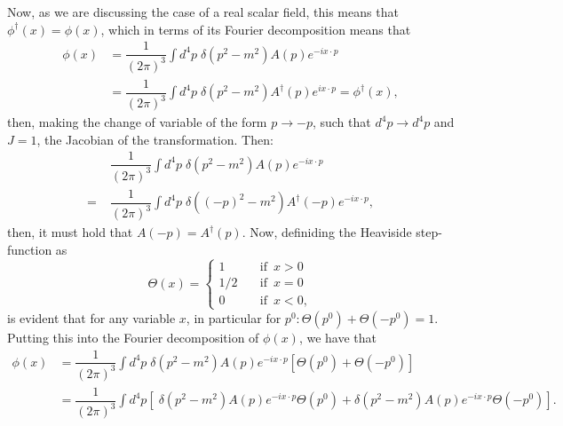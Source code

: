 Now, as we are discussing the case of a real scalar field, this means that $\phi^{\dagger}(x) = \phi(x)$, which in terms of its Fourier decomposition means that
\begin{align*}
    \phi(x) &= \dfrac{1}{(2\pi)^3}\int d^4p \; \delta(p^2 - m^2) A(p)e^{-ix\cdot p} \\
    &= \dfrac{1}{(2\pi)^3}\int d^4p \; \delta(p^2 - m^2) A^{\dagger}(p)e^{ix\cdot p} = \phi^{\dagger}(x),
\end{align*}
then, making the change of variable of the form $p\rightarrow-p$, such that $d^4p\rightarrow d^4p$ and $J=1$, the Jacobian of the transformation. Then:
\begin{align*}
    &\dfrac{1}{(2\pi)^3}\int d^4p \; \delta(p^2 - m^2) A(p)e^{-ix\cdot p} \\
    = \; &\dfrac{1}{(2\pi)^3}\int d^4p \; \delta((-p)^2 - m^2) A^{\dagger}(-p)e^{-ix\cdot p},
\end{align*}
then, it must hold that $A(-p) = A^{\dagger}(p)$. Now, definiding the Heaviside step-function as
\[   
\Theta(x) =
\begin{cases}
    1 \quad &\textrm{if}\;\ x > 0\\
    1/2 \quad &\textrm{if}\;\ x = 0\\
    0 \quad &\textrm{if}\;\ x < 0,
\end{cases} 
\]
is evident that for any variable $x$, in particular for $p^0: \Theta(p^0) + \Theta(-p^0) = 1$. Putting this into the Fourier decomposition of $\phi(x)$, we have that
\begin{align*}
    \phi(x) &= \dfrac{1}{(2\pi)^3}\int d^4p \; \delta(p^2 - m^2) A(p)e^{-ix\cdot p} \left[\Theta(p^0) + \Theta(-p^0)\right] \\
    &= \dfrac{1}{(2\pi)^3}\int d^4p \left[ \; \delta(p^2 - m^2) A(p)e^{-ix\cdot p}\Theta(p^0) + \delta(p^2 - m^2) A(p)e^{-ix\cdot p}\Theta(-p^0)\right].
\end{align*}

